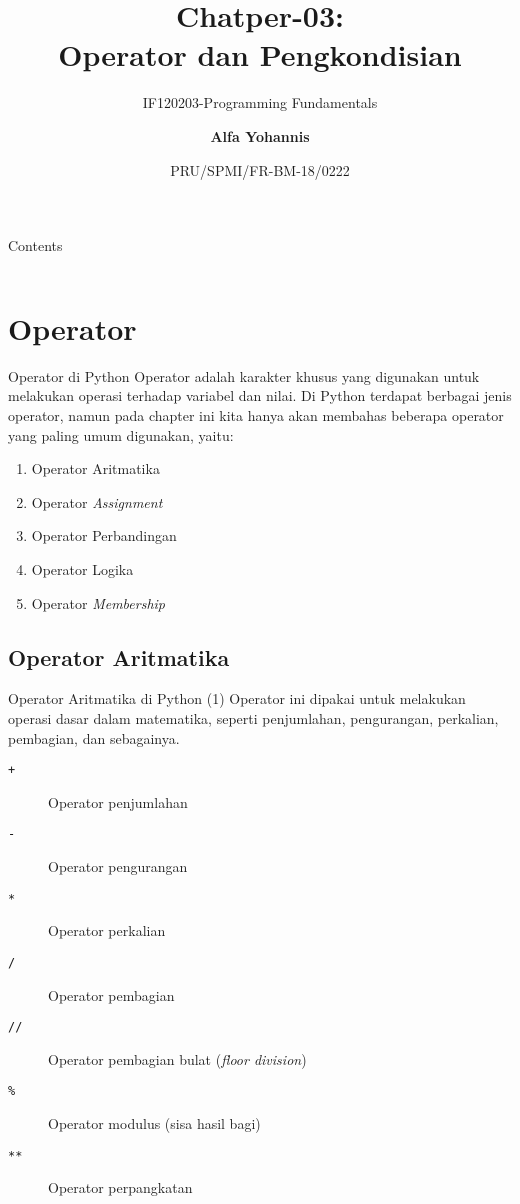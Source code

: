 \documentclass[aspectratio=169, table]{beamer}
\subtitle{IF120203-Programming Fundamentals}
\title{Chatper-03:\\\LARGE{Operator dan Pengkondisian\\}
\vspace{10pt}}
\date[Serial]{\scriptsize {PRU/SPMI/FR-BM-18/0222}}
\author[Pradita]{\small{\textbf{Alfa Yohannis}}}
\begin{document}
\frame{\titlepage}

\begin{frame}[fragile]{Contents}
\vspace{15pt}
\begin{columns}[t]
\begin{column}{.5\textwidth}
\tableofcontents[sections={1}]
\end{column}
\begin{column}{.5\textwidth}
\tableofcontents[sections={2}]
\end{column}
\end{columns}
\end{frame}

\section{Operator}

\begin{frame}{Operator di Python}
Operator adalah karakter khusus yang digunakan untuk melakukan operasi terhadap variabel dan nilai. Di Python terdapat berbagai jenis operator, namun pada chapter ini kita hanya akan membahas beberapa operator yang paling umum digunakan, yaitu:

\begin{enumerate}
    \item Operator Aritmatika
    \item Operator \textit{Assignment}
    \item Operator Perbandingan
    \item Operator Logika
    \item Operator \textit{Membership}
\end{enumerate}
\end{frame}

\subsection{Operator Aritmatika}
\begin{frame}{Operator Aritmatika di Python (1)}
Operator ini dipakai untuk melakukan operasi dasar dalam matematika, seperti penjumlahan, pengurangan, perkalian, pembagian, dan sebagainya.

\begin{description}
  \item[\texttt{+}] Operator penjumlahan
  \item[\texttt{-}] Operator pengurangan
  \item[\texttt{*}] Operator perkalian
  \item[\texttt{/}] Operator pembagian
  \item[\texttt{//}] Operator pembagian bulat (\textit{floor division})
  \item[\texttt{\%}] Operator modulus (sisa hasil bagi)
  \item[\texttt{**}] Operator perpangkatan
\end{description}
\end{frame}
\end{document}

